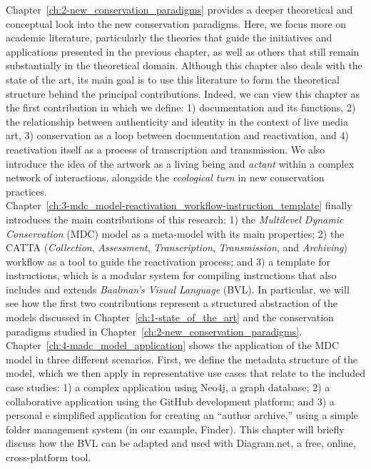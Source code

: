 Chapter~\ref{ch:2-new_conservation_paradigms} provides a deeper theoretical and conceptual look into the new conservation paradigms. Here, we focus more on academic literature, particularly the theories that guide the initiatives and applications presented in the previous chapter, as well as others that still remain substantially in the theoretical domain. Although this chapter also deals with the state of the art, its main goal is to use this literature to form the theoretical structure behind the principal contributions. Indeed, we can view this chapter as the first contribution in which we define: 1) documentation and its functions, 2) the relationship between authenticity and identity in the context of live media art, 3) conservation as a loop between documentation and reactivation, and 4) reactivation itself as a process of transcription and transmission. We also introduce the idea of the artwork as a living being and \textit{actant} within a complex network of interactions, alongside the \textit{ecological turn} in new conservation practices.\\
Chapter~\ref{ch:3-mdc_model-reactivation_workflow-instruction_template} finally introduces the main contributions of this research: 1) the \textit{Multilevel Dynamic Conservation} (MDC) model as a meta-model with its main properties; 2) the CATTA (\textit{Collection}, \textit{Assessment}, \textit{Transcription}, \textit{Transmission}, and \textit{Archiving}) workflow as a tool to guide the reactivation process; and 3) a template for instructions, which is a modular system for compiling instructions that also includes and extends \textit{Baalman’s Visual Language} (BVL). In particular, we will see how the first two contributions represent a structured abstraction of the models discussed in Chapter~\ref{ch:1-state_of_the_art} and the conservation paradigms studied in Chapter~\ref{ch:2-new_conservation_paradigms}.\\
Chapter~\ref{ch:4-madc_model_application} shows the application of the MDC model in three different scenarios. First, we define the metadata structure of the model, which we then apply in representative use cases that relate to the included case studies: 1) a complex application using Neo4j, a graph database; 2) a collaborative application using the GitHub development platform; and 3) a personal e simplified application for creating an ``author archive,'' using a simple folder management system (in our example, Finder). This chapter will briefly discuss how the BVL can be adapted and used with Diagram.net, a free, online, cross-platform tool.\\
